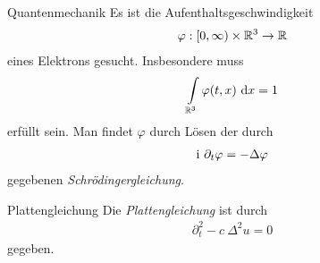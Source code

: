 \begin{genericdf}{Quantenmechanik}
Es ist die Aufenthaltsgeschwindigkeit
\begin{align*}
\varphi : [0, \infty) \times \mathbb{R}^3 \to \mathbb{R}
\end{align*}
eines Elektrons gesucht.
Insbesondere muss
\begin{align*}
\int \limits_{\mathbb{R}^3} \varphi(t,x) \ \text{\rmfamily d} x= 1
\end{align*}
erfüllt sein.
Man findet $\varphi$ durch Lösen der durch
\begin{align*}
\textrm{i} \  \partial_t \varphi  = - \Delta \varphi
\end{align*}
gegebenen \textit{Schrödingergleichung}.
\end{genericdf}

\begin{genericdf}{Plattengleichung}
Die \textit{Plattengleichung} ist durch
\begin{align*}
\partial_t^2 - c \ \Delta^2 u = 0
\end{align*}
gegeben.



\end{genericdf}